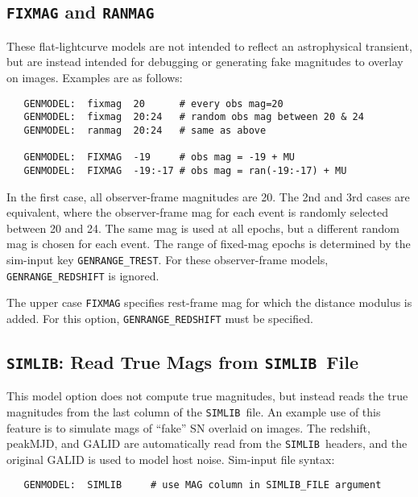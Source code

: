 \documentclass[12pt]{article}
\newcommand{\FIXMAG}{{\tt FIXMAG}}
\newcommand{\RANMAG}{{\tt RANMAG}}
\newcommand{\simlib}{{\tt SIMLIB}}
\begin{document}
\subsection{{\FIXMAG} and {\RANMAG}}
\label{subsec:fixmag}

These flat-lightcurve models are not intended to reflect an 
astrophysical transient, but are instead intended for debugging 
or generating fake magnitudes to overlay on images.
Examples are as follows:
%
\begin{verbatim}
   GENMODEL:  fixmag  20      # every obs mag=20
   GENMODEL:  fixmag  20:24   # random obs mag between 20 & 24
   GENMODEL:  ranmag  20:24   # same as above

   GENMODEL:  FIXMAG  -19     # obs mag = -19 + MU
   GENMODEL:  FIXMAG  -19:-17 # obs mag = ran(-19:-17) + MU
\end{verbatim}
%
In the first case, all observer-frame magnitudes are 20.
The 2nd and 3rd cases are equivalent, where the observer-frame mag 
for each event is randomly selected between 20 and 24.
The same mag is used at all epochs, but a different random mag
is chosen for each event. The range of fixed-mag epochs
is determined by the sim-input key {\tt GENRANGE\_TREST}.
For these observer-frame models, 
{\tt GENRANGE\_REDSHIFT} is ignored.

The upper case {\tt FIXMAG} specifies rest-frame mag for which
the distance modulus is added. 
For this option, {\tt GENRANGE\_REDSHIFT} must be specified.


\subsection{{\simlib}: Read True Mags from \simlib\ File}
\label{subsec:MODEL_SIMLIB}

This model option does not compute true magnitudes, but instead
reads the true magnitudes from the last column of the \simlib\ file.
An example use of this feature is to simulate mags of
``fake'' SN overlaid on images. The redshift, peakMJD, and GALID
are automatically read from the \simlib\ headers, and the
original GALID is used to model host noise.
Sim-input file syntax:
\begin{verbatim}
   GENMODEL:  SIMLIB     # use MAG column in SIMLIB_FILE argument
\end{verbatim}
\end{document}
